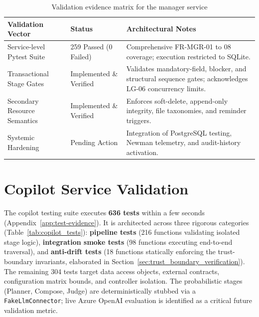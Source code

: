 \begin{table}[H]
\centering
\scriptsize
\renewcommand{\arraystretch}{1.3}
\begin{tabularx}{\textwidth}{|p{4cm}|p{2.5cm}|>{\RaggedRight\arraybackslash}X|}
\hline
\rowcolor{lightgray}
\textbf{Validation Vector} & \textbf{Status} & \textbf{Architectural Notes} \\ \hline
Service-level Pytest Suite & 259 Passed (0 Failed) & Comprehensive FR-MGR-01 to 08 coverage; execution restricted to SQLite. \\ \hline
Transactional Stage Gates & Implemented \& Verified & Validates mandatory-field, blocker, and structural sequence gates; acknowledges LG-06 concurrency limits. \\ \hline
Secondary Resource Semantics & Implemented \& Verified & Enforces soft-delete, append-only integrity, file taxonomies, and reminder triggers. \\ \hline
Systemic Hardening & Pending Action & Integration of PostgreSQL testing, Newman telemetry, and audit-history activation. \\ \hline
\end{tabularx}
\caption{Validation evidence matrix for the manager service}
\label{tab:manager_validation}
\end{table}

\section{Copilot Service Validation}
The copilot testing suite executes \textbf{636 tests} within a few seconds (Appendix~\ref{app:test-evidence}). It is architected across three rigorous categories (Table~\ref{tab:copilot_tests}): \textbf{pipeline tests} (216 functions validating isolated stage logic), \textbf{integration smoke tests} (98 functions executing end-to-end traversal), and \textbf{anti-drift tests} (18 functions statically enforcing the trust-boundary invariants, elaborated in Section~\ref{sec:trust_boundary_verification}). The remaining 304 tests target data access objects, external contracts, configuration matrix bounds, and controller isolation. The probabilistic stages (Planner, Compose, Judge) are deterministically stubbed via a \texttt{FakeLlmConnector}; live Azure OpenAI evaluation is identified as a critical future validation metric.

